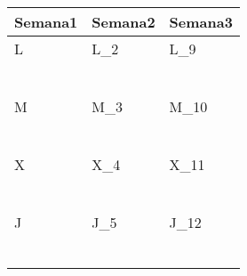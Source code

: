 \clearpage
{}


	\renewcommand{\arraystretch}{1.24}\scriptsize
	\begin{longtabu} to \textwidth { X[l] X[l] X[l]}
		\centering \textbf{Semana1} &  \centering\textbf{Semana2}  &   \centering\textbf{Semana3}  \\
		\toprule
		L & L_{2} & L_{9} \\
		  & \makebox{$\square$}\dotfill & \makebox{$\square$}\dotfill \\
		  & \dotfill & \dotfill \\
		  & \makebox{$\square$}\dotfill & \makebox{$\square$}\dotfill \\
		  & \dotfill & \dotfill \\
		  & \makebox{$\square$}\dotfill & \makebox{$\square$}\dotfill \\
		  & \dotfill & \dotfill \\

		\hline

		M & M_{3} & M_{10} \\
		  & \makebox{$\square$}\dotfill & \makebox{$\square$}\dotfill \\
		  & \dotfill & \dotfill \\
		  & \makebox{$\square$}\dotfill & \makebox{$\square$}\dotfill \\
		  & \dotfill & \dotfill \\
		  & \makebox{$\square$}\dotfill & \makebox{$\square$}\dotfill \\
		  & \dotfill & \dotfill \\

		\hline

		X & X_{4} & X_{11} \\
		  & \makebox{$\square$}\dotfill & \makebox{$\square$}\dotfill \\
		  & \dotfill & \dotfill \\
		  & \makebox{$\square$}\dotfill & \makebox{$\square$}\dotfill \\
		  & \dotfill & \dotfill \\
		  & \makebox{$\square$}\dotfill & \makebox{$\square$}\dotfill \\
		  & \dotfill & \dotfill \\

		\hline

		J & J_{5} & J_{12} \\
		  & \makebox{$\square$}\dotfill & \makebox{$\square$}\dotfill \\
		  & \dotfill & \dotfill \\
		  & \makebox{$\square$}\dotfill & \makebox{$\square$}\dotfill \\
		  & \dotfill & \dotfill \\
		  & \makebox{$\square$}\dotfill & \makebox{$\square$}\dotfill \\
		  & \dotfill & \dotfill \\


\end{longtabu}

